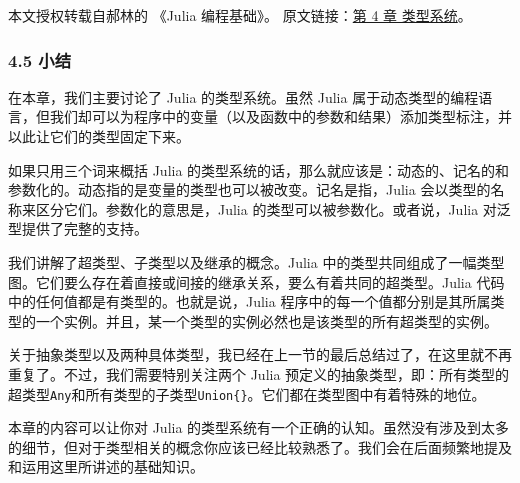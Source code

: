 
本文授权转载自郝林的 《Julia 编程基础》。 原文链接：\href{https://github.com/hyper0x/JuliaBasics/blob/master/book/ch04.md}{第 4 章 类型系统}。


\subsubsection{4.5 小结}

在本章，我们主要讨论了 Julia 的类型系统。虽然 Julia 属于动态类型的编程语言，但我们却可以为程序中的变量（以及函数中的参数和结果）添加类型标注，并以此让它们的类型固定下来。

如果只用三个词来概括 Julia 的类型系统的话，那么就应该是：动态的、记名的和参数化的。动态指的是变量的类型也可以被改变。记名是指，Julia 会以类型的名称来区分它们。参数化的意思是，Julia 的类型可以被参数化。或者说，Julia 对泛型提供了完整的支持。

我们讲解了超类型、子类型以及继承的概念。Julia 中的类型共同组成了一幅类型图。它们要么存在着直接或间接的继承关系，要么有着共同的超类型。Julia 代码中的任何值都是有类型的。也就是说，Julia 程序中的每一个值都分别是其所属类型的一个实例。并且，某一个类型的实例必然也是该类型的所有超类型的实例。

关于抽象类型以及两种具体类型，我已经在上一节的最后总结过了，在这里就不再重复了。不过，我们需要特别关注两个 Julia 预定义的抽象类型，即：所有类型的超类型\verb|Any|和所有类型的子类型\verb|Union{}|。它们都在类型图中有着特殊的地位。

本章的内容可以让你对 Julia 的类型系统有一个正确的认知。虽然没有涉及到太多的细节，但对于类型相关的概念你应该已经比较熟悉了。我们会在后面频繁地提及和运用这里所讲述的基础知识。
